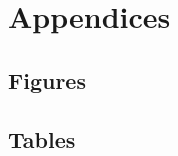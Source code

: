 
\renewcommand{\thesection}{}
\section*{Appendices}
\listoftables
\listoffigures
\restoregeometry
\setcounter{figure}{0}
\renewcommand{\thefigure}{A\arabic{figure}}
\setcounter{table}{0}
\renewcommand{\thetable}{A\arabic{table}}
\clearpage

\renewcommand\thesubsection{A}
\subsection{Figures}
%
%
%
%
%
%
%
%
%
%
\clearpage

\renewcommand\thesubsection{B}
\subsection{Tables}
%
%
%
%
%
%
%
%
%
%
\clearpage


\renewcommand\thesubsection{B}
% 
\clearpage

\renewcommand\thesubsection{C}
% 
\clearpage

